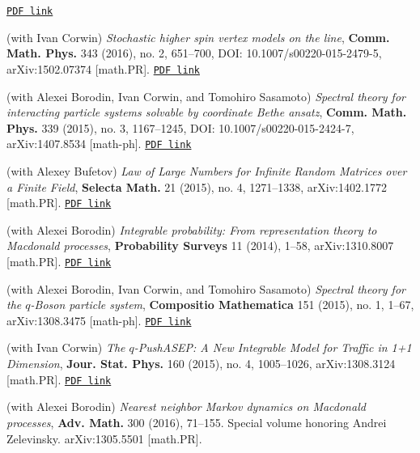 \documentclass[letterpaper,11pt]{article}
\begin{document}
\begin{etaremune}
		\href{https://storage.lpetrov.cc/research_files/Petrov-publ/19-publ-petrov-uva.pdf}{\texttt{PDF link}}
	\item
	      (with Ivan Corwin)
	      \emph{Stochastic higher spin vertex models on the line},
				\textbf{Comm. Math. Phys.} 343 (2016), no. 2, 651--700, DOI:
	      10.1007/s00220-015-2479-5, arXiv:1502.07374 [math.PR].
		\href{https://storage.lpetrov.cc/research_files/Petrov-publ/18-publ-petrov-uva.pdf}{\texttt{PDF link}}
	\item
	      (with Alexei Borodin, Ivan Corwin, and Tomohiro Sasamoto)
	      \emph{Spectral theory for interacting particle systems solvable
		      by coordinate Bethe ansatz},
					\textbf{Comm. Math. Phys.} 339 (2015), no. 3, 1167--1245, DOI:
	      10.1007/s00220-015-2424-7, arXiv:1407.8534 [math-ph].
		\href{https://storage.lpetrov.cc/research_files/Petrov-publ/17-publ-petrov-uva.pdf}{\texttt{PDF link}}
	\item
	      (with Alexey Bufetov)
	      \emph{Law of Large Numbers for Infinite Random Matrices over a
		      Finite Field},
					\textbf{Selecta Math.} 21 (2015), no. 4, 1271--1338, arXiv:1402.1772
	      [math.PR].
		\href{https://storage.lpetrov.cc/research_files/Petrov-publ/16-publ-petrov.pdf}{\texttt{PDF link}}
	\item
	      (with Alexei Borodin)
	      \emph{Integrable probability: From representation theory to
		      Macdonald processes},
					\textbf{Probability Surveys} 11 (2014), 1--58, arXiv:1310.8007 [math.PR].
		\href{https://storage.lpetrov.cc/research_files/Petrov-publ/15-publ-petrov.pdf}{\texttt{PDF link}}
	\item
	      (with Alexei Borodin, Ivan Corwin, and Tomohiro Sasamoto)
	      \emph{Spectral theory for the $q$-Boson particle system},
				\textbf{Compositio Mathematica} 151 (2015), no. 1, 1--67, arXiv:1308.3475
	      [math-ph].
		\href{https://storage.lpetrov.cc/research_files/Petrov-publ/14-publ-petrov.pdf}{\texttt{PDF link}}
	\item
	      (with Ivan Corwin)
	      \emph{The $q$-PushASEP: A New Integrable Model for Traffic in
		      1+1 Dimension},
					\textbf{Jour. Stat. Phys.} 160 (2015), no. 4, 1005--1026,
	      arXiv:1308.3124 [math.PR].
		\href{https://storage.lpetrov.cc/research_files/Petrov-publ/13-publ-petrov.pdf}{\texttt{PDF link}}
	\item
	      (with Alexei Borodin)
	      \emph{Nearest neighbor Markov dynamics on Macdonald processes},
				\textbf{Adv. Math.} 300 (2016), 71--155. Special volume
	      honoring Andrei Zelevinsky. arXiv:1305.5501 [math.PR].

\end{etaremune}
\end{document}
